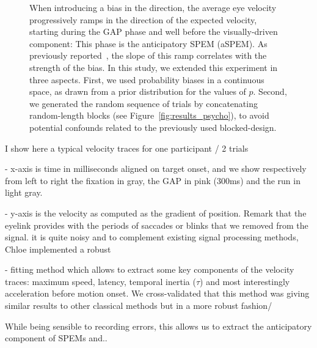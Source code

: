 \documentclass[12pt,english]{article}%
\newcommand{\citep}[1]{\parencite{#1}}
\newcommand{\seeFig}[1]{Figure~\ref{fig:#1}}
\begin{document}
\begin{figure}
{When introducing a bias in the direction,
the average eye velocity progressively ramps
in the direction of the expected velocity, starting during the GAP phase and well before the visually-driven component:
This phase is the anticipatory SPEM (aSPEM).
As previously reported~\citep{Montagnini2010, SantosKowler2017,Damasse18},
the slope of this ramp correlates with the strength of the bias.
In this study, we extended this experiment in three aspects.
First, we used probability biases in a continuous space,
as drawn from a prior distribution for the values of $p$.
Second, we generated the random sequence of trials
by concatenating random-length blocks (see \seeFig{results_psycho}),
to avoid potential confounds related to the previously used blocked-design.
}
\label{fig:introB}
\end{figure}

I show here a typical velocity traces for one participant / 2 trials

- x-axis is time in milliseconds aligned on target onset,
and we show respectively from left to right the fixation in gray,
the GAP in pink (300ms) and the run in light gray.

- y-axis is the velocity as computed as the gradient of position.
Remark that the eyelink provides with the periods of saccades or
 blinks that we removed from the signal. it is quite noisy and
 to complement existing signal processing methods,
 Chloe implemented a robust

- fitting method which allows to extract some key components of
the velocity traces: maximum speed, latency, temporal inertia ($\tau$)
 and most interestingly acceleration before motion onset.
 We cross-validated that this method was giving similar results
  to other classical methods but in a more robust fashion/

While being sensible to recording errors, this allows us to extract the
 anticipatory component of SPEMs and..

\end{document}
